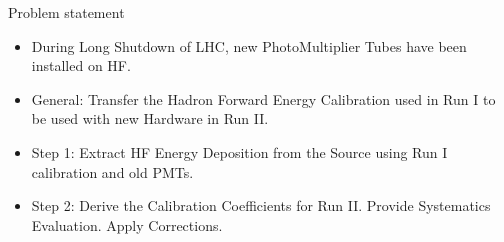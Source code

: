 \documentclass[pdf, 9pt]{beamer}
\begin{document}
{ %
    \begin{frame}[plain]
     \end{frame}
}

  \begin{frame}{Problem statement}
    \begin{itemize}
      \item During Long Shutdown of LHC, new PhotoMultiplier Tubes have been installed on HF.
      \item General: \alert{Transfer the Hadron Forward Energy Calibration used in Run I to be used with new Hardware in Run II.}
      \item Step 1: Extract HF Energy Deposition from the Source using Run I calibration and old PMTs.
      \item Step 2: Derive the Calibration Coefficients for Run II. Provide Systematics Evaluation. Apply Corrections.
    \end{itemize}
  \end{frame}
\end{document}
